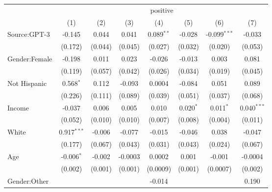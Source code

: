 
\begingroup
\centering
\begin{tabular}{lccccccc}
   \toprule
    & \multicolumn{7}{c}{positive}\\
                            & (1)           & (2)           & (3)           & (4)           & (5)           & (6)            & (7)\\  
   \midrule 
   Source:GPT-3             & -0.145        & 0.044         & 0.041         & 0.089$^{**}$  & -0.028        & -0.099$^{***}$ & -0.033\\   
                            & (0.172)       & (0.044)       & (0.045)       & (0.027)       & (0.032)       & (0.020)        & (0.053)\\   
   Gender:Female            & -0.198        & 0.011         & 0.023         & -0.026        & -0.013        & 0.003          & 0.081\\   
                            & (0.119)       & (0.057)       & (0.042)       & (0.026)       & (0.034)       & (0.019)        & (0.045)\\   
   Not Hispanic             & 0.568$^{*}$   & 0.112         & -0.093        & 0.0004        & -0.084        & 0.051          & 0.089\\   
                            & (0.226)       & (0.111)       & (0.089)       & (0.039)       & (0.051)       & (0.037)        & (0.068)\\   
   Income                   & -0.037        & 0.006         & 0.005         & 0.010         & 0.020$^{*}$   & 0.011$^{*}$    & 0.040$^{***}$\\   
                            & (0.052)       & (0.010)       & (0.010)       & (0.007)       & (0.008)       & (0.004)        & (0.011)\\   
   White                    & 0.917$^{***}$ & -0.006        & -0.077        & -0.015        & -0.046        & 0.038          & -0.047\\   
                            & (0.177)       & (0.067)       & (0.043)       & (0.031)       & (0.043)       & (0.024)        & (0.067)\\   
   Age                      & -0.006$^{*}$  & -0.002        & -0.0003       & 0.0002        & 0.001         & -0.001         & -0.0004\\   
                            & (0.002)       & (0.001)       & (0.001)       & (0.0009)      & (0.001)       & (0.0007)       & (0.002)\\   
   Gender:Other             &               &               &               & -0.014        &               &                & 0.190\\   

\end{tabular}
